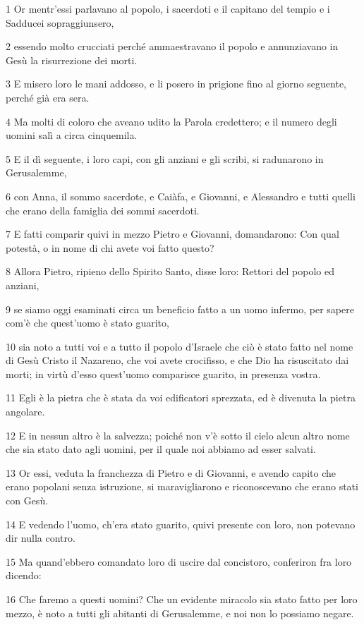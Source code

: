 \par 1 Or mentr'essi parlavano al popolo, i sacerdoti e il capitano del tempio e i Sadducei sopraggiunsero,
\par 2 essendo molto crucciati perché ammaestravano il popolo e annunziavano in Gesù la risurrezione dei morti.
\par 3 E misero loro le mani addosso, e li posero in prigione fino al giorno seguente, perché già era sera.
\par 4 Ma molti di coloro che aveano udito la Parola credettero; e il numero degli uomini salì a circa cinquemila.
\par 5 E il dì seguente, i loro capi, con gli anziani e gli scribi, si radunarono in Gerusalemme,
\par 6 con Anna, il sommo sacerdote, e Caiàfa, e Giovanni, e Alessandro e tutti quelli che erano della famiglia dei sommi sacerdoti.
\par 7 E fatti comparir quivi in mezzo Pietro e Giovanni, domandarono: Con qual potestà, o in nome di chi avete voi fatto questo?
\par 8 Allora Pietro, ripieno dello Spirito Santo, disse loro: Rettori del popolo ed anziani,
\par 9 se siamo oggi esaminati circa un beneficio fatto a un uomo infermo, per sapere com'è che quest'uomo è stato guarito,
\par 10 sia noto a tutti voi e a tutto il popolo d'Israele che ciò è stato fatto nel nome di Gesù Cristo il Nazareno, che voi avete crocifisso, e che Dio ha risuscitato dai morti; in virtù d'esso quest'uomo comparisce guarito, in presenza vostra.
\par 11 Egli è la pietra che è stata da voi edificatori sprezzata, ed è divenuta la pietra angolare.
\par 12 E in nessun altro è la salvezza; poiché non v'è sotto il cielo alcun altro nome che sia stato dato agli uomini, per il quale noi abbiamo ad esser salvati.
\par 13 Or essi, veduta la franchezza di Pietro e di Giovanni, e avendo capito che erano popolani senza istruzione, si maravigliarono e riconoscevano che erano stati con Gesù.
\par 14 E vedendo l'uomo, ch'era stato guarito, quivi presente con loro, non potevano dir nulla contro.
\par 15 Ma quand'ebbero comandato loro di uscire dal concistoro, conferiron fra loro dicendo:
\par 16 Che faremo a questi uomini? Che un evidente miracolo sia stato fatto per loro mezzo, è noto a tutti gli abitanti di Gerusalemme, e noi non lo possiamo negare.
